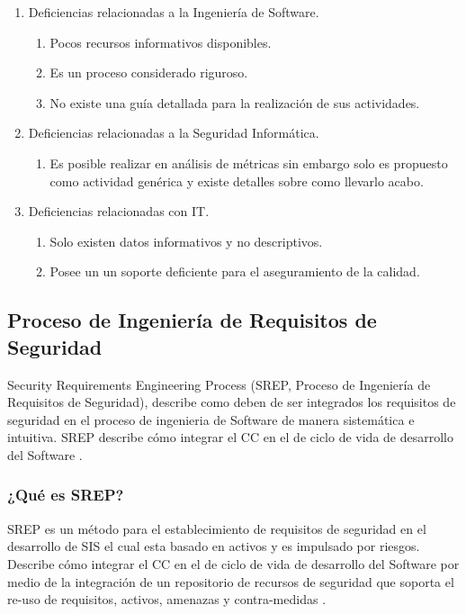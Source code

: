 \documentclass[runningheads,a4paper]{llncs}
\begin{document}
\begin{enumerate}
	\item Deficiencias relacionadas a la Ingeniería de \gls{Software}.
		\begin{enumerate}
			\item Pocos recursos informativos disponibles. 
			\item Es un proceso considerado riguroso.
			\item No existe una guía detallada para la realización de sus actividades.\\
			
		\end{enumerate}
	\item Deficiencias relacionadas a la Seguridad Informática.
		\begin{enumerate}
			\item Es posible realizar en análisis de métricas sin embargo solo es propuesto como actividad genérica y existe detalles sobre como llevarlo acabo.\\
			
		\end{enumerate}
	\item Deficiencias relacionadas con \gls{IT}.
		\begin{enumerate}
			\item Solo existen datos informativos y no descriptivos.
			\item Posee un un soporte deficiente para el aseguramiento de la calidad.
			
		\end{enumerate}
\end{enumerate}

\subsection{Proceso de Ingeniería de Requisitos de Seguridad}
Security Requirements Engineering Process (SREP, Proceso de Ingeniería de Requisitos de Seguridad), describe como deben de ser integrados los requisitos de seguridad en el proceso de ingenieria de \gls{Software} de manera sistemática e intuitiva. \gls{SREP} describe cómo integrar el \gls{CC} en el de ciclo de vida de desarrollo del \gls{Software} \cite{SREPMellado}.  

\subsubsection{¿Qué es \gls{SREP}?}
\gls{SREP} es un método para el establecimiento de requisitos de seguridad en el desarrollo de \gls{SIS} el cual esta basado en activos y es impulsado por riesgos. Describe cómo integrar el \gls{CC} en el de ciclo de vida de desarrollo del \gls{Software} por medio de la integración de un repositorio de recursos de seguridad que soporta el re-uso de requisitos, activos, amenazas y contra-medidas  \cite{SREPMellado}.\\
\end{document}
